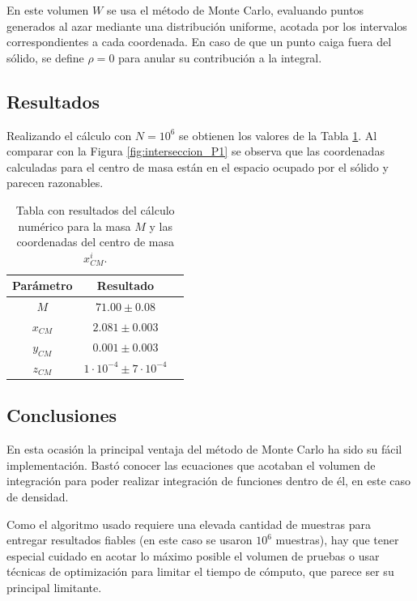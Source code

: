 \documentclass{article}
\begin{document}
En este volumen $W$ se usa el método de Monte Carlo, evaluando puntos generados al azar mediante una distribución uniforme, acotada por los intervalos correspondientes a cada coordenada. En caso de que un punto caiga fuera del sólido, se define $\rho = 0$ para anular su contribución a la integral.

\subsection{Resultados}

Realizando el cálculo con $N = 10^6$ se obtienen los valores de la Tabla \ref{tab:resultados}. Al comparar con la Figura \ref{fig:interseccion_P1} se observa que las coordenadas calculadas para el centro de masa están en el espacio ocupado por el sólido y parecen razonables.

\begin{table}[hl]
\centering
\begin{tabular}{|c|c|c|}
\hline
  Parámetro & Resultado \\
  \hline
  $M$ & $71.00 \pm 0.08$  \\ \hline
  $x_{CM}$ & $2.081 \pm 0.003$\\ \hline
  $y_{CM}$ & $0.001 \pm 0.003$\\ \hline
  $z_{CM}$ & $1 \cdot 10^{-4} \pm 7 \cdot 10^{-4}$\\ \hline
\end{tabular}
\caption{Tabla con resultados del cálculo numérico para la masa $M$ y las coordenadas del centro de masa $x^i_{CM}$.}
\label{tab:resultados}
\end{table}

\subsection{Conclusiones}

En esta ocasión la principal ventaja del método de Monte Carlo ha sido su fácil implementación. Bastó conocer las ecuaciones que acotaban el volumen de integración para poder realizar integración de funciones dentro de él, en este caso de densidad.

Como el algoritmo usado requiere una elevada cantidad de muestras para entregar resultados fiables (en este caso se usaron $10^6$ muestras), hay que tener especial cuidado en acotar lo máximo posible el volumen de pruebas o usar técnicas de optimización para limitar el tiempo de cómputo, que parece ser su principal limitante.
\end{document}
